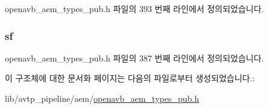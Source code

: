 openavb\+\_\+aem\+\_\+types\+\_\+pub.\+h 파일의 393 번째 라인에서 정의되었습니다.

\subsubsection[{\texorpdfstring{sf}{sf}}]{ sf}\hypertarget{structopenavb__aem__stream__format__iec__61883__6__float__t_a153db177c2b7653917dff143e5f755e1}{}\label{structopenavb__aem__stream__format__iec__61883__6__float__t_a153db177c2b7653917dff143e5f755e1}


openavb\+\_\+aem\+\_\+types\+\_\+pub.\+h 파일의 387 번째 라인에서 정의되었습니다.



이 구조체에 대한 문서화 페이지는 다음의 파일로부터 생성되었습니다.\+:\begin{DoxyCompactItemize}
\item 
lib/avtp\+\_\+pipeline/aem/\hyperlink{openavb__aem__types__pub_8h}{openavb\+\_\+aem\+\_\+types\+\_\+pub.\+h}\end{DoxyCompactItemize}
